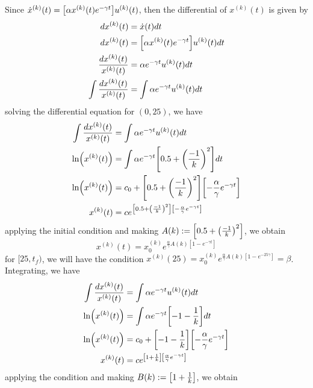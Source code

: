 \documentclass[11pt,letterpaper]{article}
\let\originalleft\left
\let\originalright\right
\renewcommand{\left}{\mathopen{}\mathclose\bgroup\originalleft}
\renewcommand{\right}{\aftergroup\egroup\originalright}
\theoremstyle{definition}
\begin{document}
\begin{enumerate}[label=\alph*)]
    Since $\dot{x}^{(k)}(t)=\left[\alpha x^{(k)}(t)e^{-\gamma t}\right]u^{(k)}(t)$, then the differential of $x^{(k)}(t)$ is given by
    \[
    \begin{split}
        dx^{(k)}(t)&=\dot{x}(t)dt\\
        dx^{(k)}(t)&=\left[\alpha x^{(k)}(t)e^{-\gamma t}\right]u^{(k)}(t)dt\\
        \dfrac{dx^{(k)}(t)}{x^{(k)}(t)}&=\alpha e^{-\gamma t}u^{(k)}(t)dt\\
        \int\dfrac{dx^{(k)}(t)}{x^{(k)}(t)}&=\int \alpha e^{-\gamma t}u^{(k)}(t)dt
    \end{split}
    \]
    solving the differential equation for $(0,25)$, we have
    \[
    \begin{split}
        \int\dfrac{dx^{(k)}(t)}{x^{(k)}(t)}&=\int \alpha e^{-\gamma t}u^{(k)}(t)dt\\
        \ln\left(x^{(k)}(t)\right)&=\int \alpha e^{-\gamma t}\left[0.5+\left(\dfrac{-1}{k}\right)^2\right]dt\\
        \ln\left(x^{(k)}(t)\right)&=c_0+\left[0.5+\left(\dfrac{-1}{k}\right)^2\right]\left[-\dfrac{\alpha}{\gamma}e^{-\gamma t}\right]\\
        x^{(k)}(t)&=ce^{\left[0.5+\left(\frac{-1}{k}\right)^2\right]\left[-\frac{\alpha}{\gamma}e^{-\gamma t}\right]}
    \end{split}
    \]
    applying the initial condition and making $A(k):=\left[0.5+\left(\frac{-1}{k}\right)^2\right]$, we obtain
    \begin{equation}
        x^{(k)}(t)=x_0^{(k)}e^{\frac{\alpha}{\gamma}A(k)[1-e^{-\gamma t}]}
    \end{equation}
    for $[25,t_f)$, we will have the condition $x^{(k)}(25)=x_0^{(k)}e^{\frac{\alpha}{\gamma}A(k)[1-e^{-25\gamma}]}=\beta$. Integrating, we have
    \[
    \begin{split}
        \int\dfrac{dx^{(k)}(t)}{x^{(k)}(t)}&=\int \alpha e^{-\gamma t}u^{(k)}(t)dt\\
        \ln\left(x^{(k)}(t)\right)&=\int \alpha e^{-\gamma t}\left[-1-\dfrac{1}{k}\right]dt\\
        \ln\left(x^{(k)}(t)\right)&=c_0 + \left[-1-\dfrac{1}{k}\right]\left[-\dfrac{\alpha}{\gamma}e^{-\gamma t}\right]\\
        x^{(k)}(t)&=ce^{\left[1+\frac{1}{k}\right]\left[\frac{\alpha}{\gamma}e^{-\gamma t}\right]}
    \end{split}
    \]
    applying the condition and making $B(k):=\left[1+\frac{1}{k}\right]$, we obtain
    \begin{equation}

\end{equation}
\end{enumerate}
\end{document}
